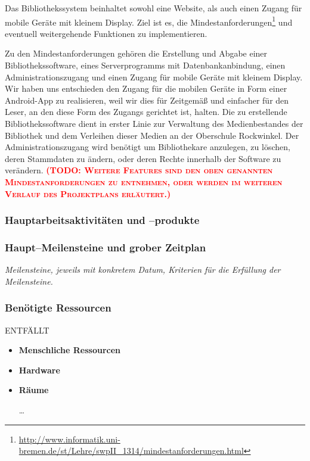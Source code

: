 \documentclass[fontsize=12pt,paper=a4,twoside]{scrartcl}
\newcommand{\todo}[1]{\textbf{\textsc{\textcolor{red}{(TODO: #1)}}}}
\begin{document}
Das Bibliothekssystem beinhaltet sowohl eine Website, als auch einen Zugang für mobile Geräte mit kleinem Display. Ziel ist es, die Mindestanforderungen\footnote{\url{http://www.informatik.uni-bremen.de/st/Lehre/swpII_1314/mindestanforderungen.html}} und eventuell weitergehende Funktionen zu implementieren.

Zu den Mindestanforderungen gehören die Erstellung und Abgabe einer Bibliothekssoftware, eines Serverprogramms mit Datenbankanbindung, einen Administrationszugang und einen Zugang für mobile Geräte mit kleinem Display. Wir haben uns entschieden den Zugang für die mobilen Geräte in Form einer Android-App zu realisieren, weil wir dies für Zeitgemäß und einfacher für den Leser, an den diese Form des Zugangs gerichtet ist, halten. Die zu erstellende Bibliothekssoftware dient in erster Linie zur Verwaltung des Medienbestandes der Bibliothek und dem Verleihen dieser Medien an der Oberschule Rockwinkel. Der Administrationszugang wird benötigt um Bibliothekare anzulegen, zu löschen, deren Stammdaten zu ändern, oder deren Rechte innerhalb der Software zu verändern. \todo{Weitere Features sind den oben genannten Mindestanforderungen zu entnehmen, oder werden im weiteren Verlauf des Projektplans erläutert.}


\subsubsection{Hauptarbeitsaktivitäten und --produkte}

\subsubsection{Haupt--Meilensteine und grober Zeitplan}

{\em Meilensteine, jeweils mit konkretem Datum,
 Kriterien für die Erfüllung der Meilensteine.}


\subsubsection{Benötigte Ressourcen}
ENTFÄLLT
\begin{itemize}
\item \textbf{Menschliche Ressourcen}

\item \textbf{Hardware}

\item \textbf{Räume}

\dots

\end{itemize}
\end{document}
